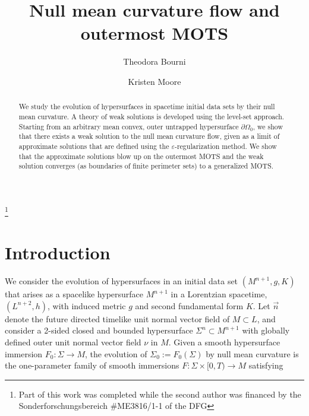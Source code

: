 \documentclass[11pt]{amsart}
\title{Null mean curvature flow and outermost MOTS}
\renewcommand{\epsilon}{\varepsilon}
\def\e{\epsilon}
\begin{document}
\author{Theodora Bourni \and Kristen Moore}
\thanks{Part of this work was completed while the second author was financed by the Sonderforschungsbereich \#ME3816/1-1 of the DFG}


\begin{abstract} We study the evolution of hypersurfaces in spacetime initial data sets by their null mean curvature. A theory of weak solutions is developed using the level-set approach. Starting from an arbitrary mean convex, outer untrapped hypersurface $\partial\Omega_0$, we show that there exists a weak solution to the null mean curvature flow, given as a limit of approximate solutions that are defined using the $\e$-regularization method. We show that the approximate solutions blow up on the outermost MOTS and the weak solution converges (as boundaries of finite perimeter sets) to a generalized MOTS.
\end{abstract}
\maketitle
\tableofcontents
\section{Introduction}
\noindent We consider the evolution of hypersurfaces in an initial data set $(M^{n+1},g,K)$ that arises as a spacelike hypersurface $M^{n+1}$ in a Lorentzian spacetime, $(L^{n+2},h)$, with induced metric $g$ and second fundamental form  $K$. Let $\vec{n}$ denote the future directed timelike unit normal vector field of $M\subset L$, and consider a 2-sided closed and bounded hypersurface $\Sigma^{n}\subset M^{n+1}$ with globally defined outer unit normal vector field $\nu$ in $M$. Given a smooth hypersurface immersion $F_{0}:\Sigma\rightarrow M$, the evolution of $\Sigma_{0}:=F_{0}(\Sigma)$ by null mean curvature is the one-parameter family of smooth immersions $F:\Sigma\times[0,T)\rightarrow M$ satisfying
\end{document}
